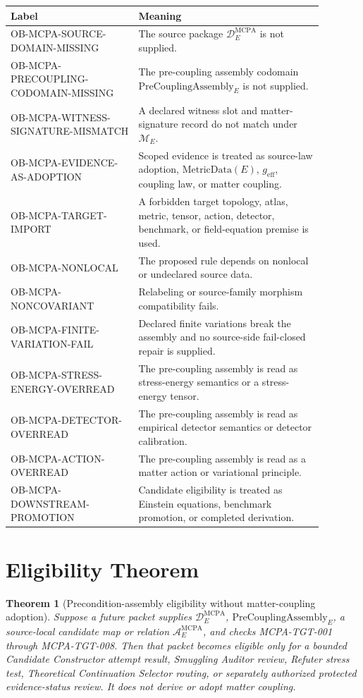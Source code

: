 \documentclass[11pt]{article}
\newcommand{\MetricData}{\mathrm{MetricData}}
\newcommand{\geff}{g_{\mathrm{eff}}}
\newcommand{\PreCoupAsm}{\mathrm{PreCouplingAssembly}}
\newtheorem{theorem}{Theorem}
\begin{document}
\begin{longtable}{p{0.36\linewidth}p{0.52\linewidth}}
\toprule
Label & Meaning \\
\midrule
OB-MCPA-SOURCE-DOMAIN-MISSING & The source package \(\mathcal{D}^{\mathrm{MCPA}}_E\) is not supplied. \\
OB-MCPA-PRECOUPLING-CODOMAIN-MISSING & The pre-coupling assembly codomain \(\PreCoupAsm_E\) is not supplied. \\
OB-MCPA-WITNESS-SIGNATURE-MISMATCH & A declared witness slot and matter-signature record do not match under \(\mathcal{M}_E\). \\
OB-MCPA-EVIDENCE-AS-ADOPTION & Scoped evidence is treated as source-law adoption, \(\MetricData(E)\), \(\geff\), coupling law, or matter coupling. \\
OB-MCPA-TARGET-IMPORT & A forbidden target topology, atlas, metric, tensor, action, detector, benchmark, or field-equation premise is used. \\
OB-MCPA-NONLOCAL & The proposed rule depends on nonlocal or undeclared source data. \\
OB-MCPA-NONCOVARIANT & Relabeling or source-family morphism compatibility fails. \\
OB-MCPA-FINITE-VARIATION-FAIL & Declared finite variations break the assembly and no source-side fail-closed repair is supplied. \\
OB-MCPA-STRESS-ENERGY-OVERREAD & The pre-coupling assembly is read as stress-energy semantics or a stress-energy tensor. \\
OB-MCPA-DETECTOR-OVERREAD & The pre-coupling assembly is read as empirical detector semantics or detector calibration. \\
OB-MCPA-ACTION-OVERREAD & The pre-coupling assembly is read as a matter action or variational principle. \\
OB-MCPA-DOWNSTREAM-PROMOTION & Candidate eligibility is treated as Einstein equations, benchmark promotion, or completed derivation. \\
\bottomrule
\end{longtable}

\section{Eligibility Theorem}

\begin{theorem}[Precondition-assembly eligibility without matter-coupling adoption]
Suppose a future packet supplies \(\mathcal{D}^{\mathrm{MCPA}}_E\),
\(\PreCoupAsm_E\), a source-local candidate map or relation
\(\mathcal{A}^{\mathrm{MCPA}}_E\), and checks MCPA-TGT-001 through
MCPA-TGT-008. Then that packet becomes eligible only for a bounded Candidate
Constructor attempt result, Smuggling Auditor review, Refuter stress test,
Theoretical Continuation Selector routing, or separately authorized protected
evidence-status review. It does not derive or adopt matter coupling.
\end{theorem}
\end{document}
